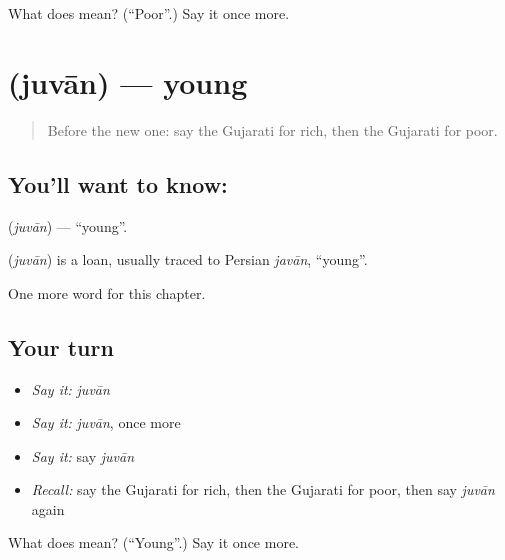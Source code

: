 \begin{tcolorbox}[breakable,colback=teal!4,colframe=teal!35!black,title={Before you move on}]
What does  mean? (\textquotedblleft{}Poor\textquotedblright{}.) Say it once more.
\end{tcolorbox}
\section[\texorpdfstring{\gu{જુવાન} (juvān)}{જુવાન (juvān)}]{ (juvān) — young}

\label{lesson:GU-C137-juvan}



\begin{quote}
Before the new one: say the Gujarati for rich, then the Gujarati for poor.
\end{quote}

\subsection*{You'll want to know: }
\textbf{} (\emph{juvān}) — \textquotedblleft{}young\textquotedblright{}.

\begin{cousinweb}
\textbf{} (\emph{juvān}) is a loan, usually traced to Persian \emph{javān}, \textquotedblleft{}young\textquotedblright{}.
\end{cousinweb}

\begin{grammarlens}[title={What you've built}]
One more word for this chapter.
\end{grammarlens}

\subsection*{Your turn}
\begin{itemize}
\raggedright
  \item \emph{Say it:} \emph{juvān}
  \item \emph{Say it:} \emph{juvān}, once more
  \item \emph{Say it:} say \emph{juvān}
  \item \emph{Recall:} say the Gujarati for rich, then the Gujarati for poor, then say \emph{juvān} again
\end{itemize}

\begin{tcolorbox}[breakable,colback=teal!4,colframe=teal!35!black,title={Before you move on}]
What does  mean? (\textquotedblleft{}Young\textquotedblright{}.) Say it once more.
\end{tcolorbox}

